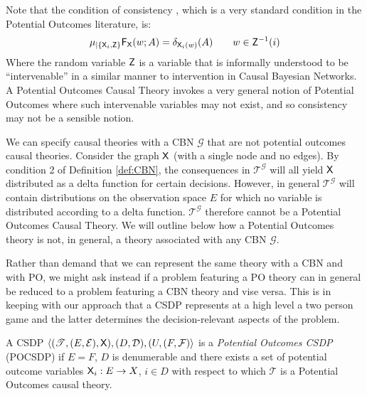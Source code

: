 Note that the condition of consistency \citep{richardson2013single}, which is a very standard condition in the Potential Outcomes literature, is:
\begin{align}
    \mu_{|\{\mathsf{X}_i,\mathsf{Z}\}} \mathsf{F}_{\mathsf{X}} (w;A) = \delta_{\mathsf{X}_i(w)} (A) \qquad w\in \mathsf{Z}^{-1}(i)
\end{align}
Where the random variable $\mathsf{Z}$ is a variable that is informally understood to be ``intervenable'' in a similar manner to intervention in Causal Bayesian Networks. A Potential Outcomes Causal Theory invokes a very general notion of Potential Outcomes where such intervenable variables may not exist, and so consistency may not be a sensible notion.

We can specify causal theories with a CBN $\mathcal{G}$ that are not potential outcomes causal theories. Consider the graph $\mathsf{X}$ (with a single node and no edges). By condition 2 of Definition \ref{def:CBN}, the consequences in $\mathscr{T}^{\mathcal{G}}$ will all yield $\mathsf{X}$ distributed as a delta function for certain decisions. However, in general $\mathscr{T}^{\mathcal{G}}$ will contain distributions on the observation space $E$ for which no variable is distributed according to a delta function. $\mathscr{T}^{\mathcal{G}}$ therefore cannot be a Potential Outcomes Causal Theory. We will outline below how a Potential Outcomes theory is not, in general, a theory associated with any CBN $\mathcal{G}$.

Rather than demand that we can represent the same theory with a CBN and with PO, we might ask instead if a problem featuring a PO theory can in general be reduced to a problem featuring a CBN theory and vise versa. This is in keeping with our approach that a CSDP represents at a high level a two person game and the latter determines the decision-relevant aspects of the problem.


\begin{definition}
A CSDP $\langle (\mathscr{T},(E,\mathcal{E}),\mathsf{X}),(D,\mathcal{D}), (U,(F,\mathcal{F})\rangle$ is a \emph{Potential Outcomes CSDP} (POCSDP) if $E=F$, $D$ is denumerable and there exists a set of potential outcome variables $\mathsf{X}_i:E\to X$, $i\in D$ with respect to which $\mathscr{T}$ is a Potential Outcomes causal theory.
\end{definition}


